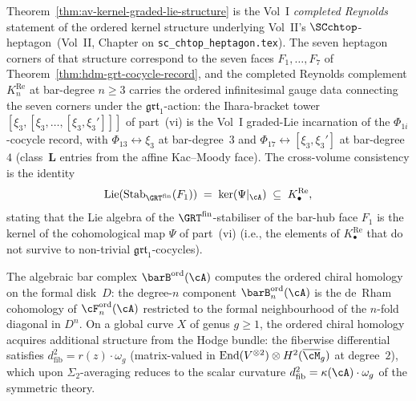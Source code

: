 \begin{remark}
\label{rem:av-kernel-xvol-vol2}
Theorem~\textup{\ref{thm:av-kernel-graded-lie-structure}} is the
Vol~I \emph{completed Reynolds} statement of the ordered kernel
structure underlying Vol~II's
$\SCchtop$-heptagon~\textup{(}Vol~II, Chapter on
\texttt{sc\_chtop\_heptagon.tex}\textup{)}. The seven heptagon
corners of that structure correspond to the seven faces
$F_1,\dots,F_7$ of Theorem~\textup{\ref{thm:hdm-grt-cocycle-record}},
and the completed Reynolds complement \(K^{\mathrm{Re}}_n\) at
bar-degree \(n\geq3\) carries the ordered infinitesimal gauge data
connecting the seven corners under the \(\mathfrak{grt}_1\)-action:
the
Ihara-bracket tower $[\xi_3,[\xi_3,\dots,[\xi_3,\xi_3']]]$ of
part~\textup{(vi)} is the Vol~I graded-Lie incarnation of the
$\Phi_{1i}$-cocycle record, with
$\Phi_{13}\leftrightarrow\xi_3$ at bar-degree~$3$ and
$\Phi_{17}\leftrightarrow[\xi_3,\xi_3']$ at bar-degree~$4$
(class~$\mathbf{L}$ entries from the affine Kac--Moody face). The cross-volume consistency
is the identity
\[
 \mathrm{Lie}(\mathrm{Stab}_{\GRT^{\mathrm{fin}}}(F_1))
 \;=\;
 \ker(\Psi|_{\cA})
 \;\subseteq\;
 K^{\mathrm{Re}}_\bullet,
\]
stating that the Lie algebra of the $\GRT^{\mathrm{fin}}$-stabiliser
of the bar-hub face $F_1$ is the kernel of the cohomological map
$\Psi$ of part~\textup{(vi)} (i.e., the elements of
\(K^{\mathrm{Re}}_\bullet\) that do not survive to non-trivial
$\mathfrak{grt}_1$-cocycles).
\end{remark}

\begin{remark}
\label{rem:ordered-ch-hom-bar}
The algebraic bar complex $\barB^{\mathrm{ord}}(\cA)$ computes the
ordered chiral homology on the formal disk~$D$: the degree-$n$
component $\barB^{\mathrm{ord}}_n(\cA)$ is the de~Rham cohomology
of $\cF^{\mathrm{ord}}_n(\cA)$ restricted to the formal
neighbourhood of the $n$-fold diagonal in $D^n$. On a global
curve $X$ of genus $g \ge 1$, the ordered chiral homology
acquires additional structure from the Hodge bundle: the
fiberwise differential satisfies
$d^2_{\mathrm{fib}} = r(z) \cdot \omega_g$
(matrix-valued in $\operatorname{End}(V^{\otimes 2})
\otimes H^{2}(\overline{\cM}_g)$ at degree~$2$), which upon
$\Sigma_2$-averaging reduces to the scalar curvature
$d^2_{\mathrm{fib}} = \kappa(\cA) \cdot \omega_g$ of
the symmetric theory.
\end{remark}

